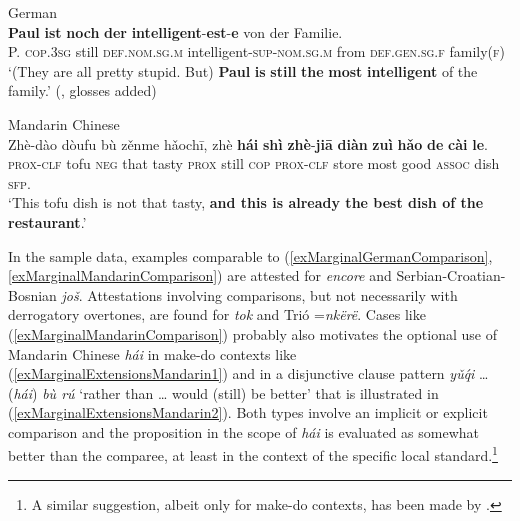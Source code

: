 \begin{exe}
	\ex German\label{exMarginalGermanComparison}\\
	\gll \textbf{Paul} \textbf{ist} \textbf{noch} \textbf{der} \textbf{intelligent}-\textbf{est}-\textbf{e} von der Familie.\\
	P. \textsc{cop}.3\textsc{sg} still \textsc{def}.\textsc{nom}.\textsc{sg}.\textsc{m} intelligent-\textsc{sup}-\textsc{nom}.\textsc{sg}.\textsc{m} from \textsc{def}.\textsc{gen}.\textsc{sg}.\textsc{f} family(\textsc{f})\\
	\glt \lq (They are all pretty stupid. But) \textbf{Paul} \textbf{is} \textbf{still} \textbf{the} \textbf{most} \textbf{intelligent} of the family.'  (\cite[190]{Koenig1977}, glosses added)

	\ex Mandarin Chinese\label{exMarginalMandarinComparison}\\
	\gll Zhè-dào	dòufu	bù	zěnme		hǎochī,	zhè	\textbf{hái}	\textbf{shì}	\textbf{zhè}-\textbf{jiā}	\textbf{diàn}	\textbf{zuì}	\textbf{hǎo}	\textbf{de} \textbf{cài}	\textbf{le}.\\
	\textsc{prox}-\textsc{clf} tofu \textsc{neg} that tasty \textsc{prox} still \textsc{cop} \textsc{prox}-\textsc{clf} store most good \textsc{assoc} dish \textsc{sfp}.\\
	\glt \lq This tofu dish is not that tasty, \textbf{and this is already the best dish of the restaurant}.' \parencite[60]{Liu2000}
\end{exe}

In the sample data, examples comparable to (\ref{exMarginalGermanComparison}, \ref{exMarginalMandarinComparison}) are attested for  \textit{encore} and Serbian-Croatian-Bosnian \textit{još}. Attestations involving comparisons, but not necessarily with derrogatory overtones, are found for  \textit{tok} and Trió \mbox{=\textit{nkërë}}. Cases like (\ref{exMarginalMandarinComparison}) probably also motivates the optional use of Mandarin Chinese \textit{hái} in make-do contexts like (\ref{exMarginalExtensionsMandarin1}) and in a disjunctive clause pattern \textit{yǔq́i} … (\textit{hái}) \textit{bù rú} \lq rather than … would (still) be better' that is illustrated in (\ref{exMarginalExtensionsMandarin2}). Both types involve an implicit or explicit comparison and the proposition in the scope of \textit{hái} is evaluated as somewhat better than the comparee, at least in the context of the specific local standard.\footnote{A similar suggestion, albeit only for make-do contexts, has been made by \textcite{Paris1988}.}

